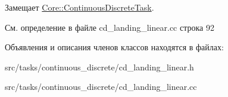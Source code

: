 Замещает \hyperlink{class_core_1_1_continuous_discrete_task_a961cc49fd0c72ba0a211bb4913ca3ece}{Core\+::\+Continuous\+Discrete\+Task}.



См. определение в файле cd\+\_\+landing\+\_\+linear.\+cc строка 92



Объявления и описания членов классов находятся в файлах\+:\begin{DoxyCompactItemize}
\item 
src/tasks/continuous\+\_\+discrete/cd\+\_\+landing\+\_\+linear.\+h\item 
src/tasks/continuous\+\_\+discrete/cd\+\_\+landing\+\_\+linear.\+cc\end{DoxyCompactItemize}

